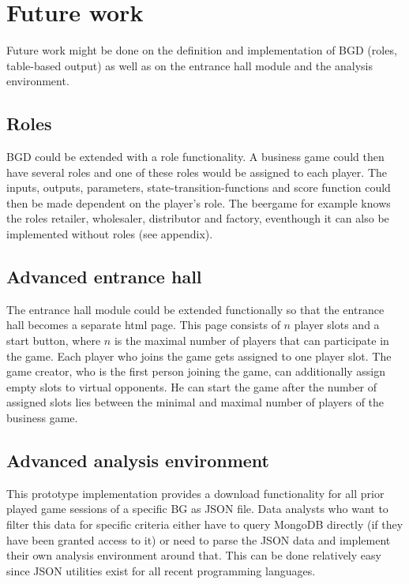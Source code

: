 \section{Future work}
\label{sec:futurework}

Future work might be done on the definition and implementation of BGD (roles, table-based output) as well as on the entrance hall module and the analysis environment.

\subsection{Roles}
\label{sub:conclusion:roles}

BGD could be extended with a role functionality. A business game could then have several roles and one of these roles would be assigned to each player. The inputs, outputs, parameters, state-transition-functions and score function could then be made dependent on the player's role. The beergame for example knows the roles retailer, wholesaler, distributor and factory, eventhough it can also be implemented without roles (see appendix).

\subsection{Advanced entrance hall}
\label{sub:conclusion:entrance}

The entrance hall module could be extended functionally so that the entrance hall becomes a separate html page. This page consists of $n$ player slots and a start button, where $n$ is the maximal number of players that can participate in the game. Each player who joins the game gets assigned to one player slot. The game creator, who is the first person joining the game, can additionally assign empty slots to virtual opponents. He can start the game after the number of assigned slots lies between the minimal and maximal number of players of the business game.

\subsection{Advanced analysis environment}
\label{sub:conclusion:analysis}

This prototype implementation provides a download functionality for all prior played game sessions of a specific BG as JSON file. Data analysts who want to filter this data for specific criteria either have to query MongoDB directly (if they have been granted access to it) or need to parse the JSON data and implement their own analysis environment around that. This can be done relatively easy since JSON utilities exist for all recent programming languages. 

